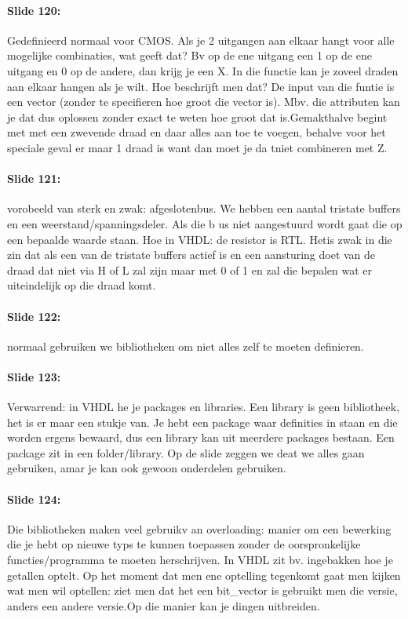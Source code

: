 \documentclass[10pt,a4paper]{book}
\begin{document}
\paragraph{Slide 120:} Gedefinieerd normaal voor CMOS. Als je 2 uitgangen aan elkaar hangt voor alle mogelijke combinaties, wat geeft dat? Bv op de ene uitgang een 1 op de ene uitgang en 0 op de andere, dan krijg je een X. In die functie kan je zoveel draden aan elkaar hangen als je wilt. Hoe beschrijft men dat? De input van die funtie is een vector (zonder te specifieren hoe groot die vector is). Mbv. die attributen kan je dat dus oplossen zonder exact te weten hoe groot dat is.Gemakthalve begint met met een zwevende draad en daar alles aan toe te voegen, behalve voor het speciale geval er maar 1 draad is want dan moet je da tniet combineren met Z. 

\paragraph{Slide 121:} vorobeeld van sterk en zwak: afgeslotenbus. We hebben een aantal tristate buffers en een weerstand/spanningsdeler. Als die b us niet aangestuurd wordt gaat die op een bepaalde waarde staan. Hoe in VHDL: de resistor is RTL. Hetis zwak in die zin dat als een van de tristate buffers actief is en een aansturing doet van de draad dat niet via H of L zal zijn maar met 0 of 1 en zal die bepalen wat er uiteindelijk op die draad komt. 

\paragraph{Slide 122:} normaal gebruiken we bibliotheken om niet alles zelf te moeten definieren.

\paragraph{Slide 123:} Verwarrend: in VHDL he je packages en libraries. Een library is geen bibliotheek, het is er maar een stukje van. Je hebt een package waar definities in staan en die worden ergens bewaard, dus een library kan uit meerdere packages bestaan. Een package zit in een folder/library. Op de slide zeggen we deat we alles gaan gebruiken, amar je kan ook gewoon onderdelen gebruiken.

\paragraph{Slide 124:} Die bibliotheken maken veel gebruikv an overloading: manier om een bewerking die je hebt op nieuwe typs te kunnen toepassen zonder de oorspronkelijke functies/programma te moeten herschrijven. In VHDL zit bv. ingebakken hoe je getallen optelt. Op het moment dat men ene optelling tegenkomt gaat men kijken wat men wil optellen: ziet men dat het een bit\_vector is gebruikt men die versie, anders een andere versie.Op die manier kan je dingen uitbreiden.
\end{document}
